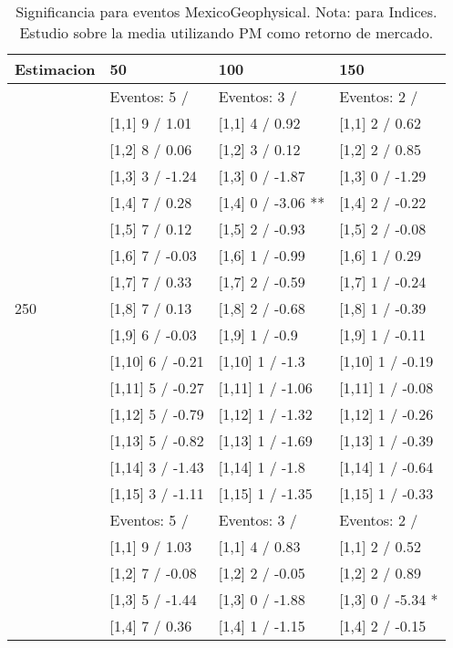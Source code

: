 \begin{table}

\caption{Significancia para eventos MexicoGeophysical. Nota: para Indices. Estudio sobre la media utilizando PM como retorno de mercado.}
\centering
\begin{tabular}[t]{llll}
\toprule
Estimacion & 50 & 100 & 150\\
\midrule
 & Eventos:  5 / & Eventos:  3 / & Eventos:  2 /\\
 & {}[1,1] 9  / 1.01 & {}[1,1] 4  / 0.92 & {}[1,1] 2  / 0.62\\
 & {}[1,2] 8  / 0.06 & {}[1,2] 3  / 0.12 & {}[1,2] 2  / 0.85\\
 & {}[1,3] 3  / -1.24 & {}[1,3] 0  / -1.87 & {}[1,3] 0  / -1.29\\
 & {}[1,4] 7  / 0.28 & {}[1,4] 0  / -3.06 ** & {}[1,4] 2  / -0.22\\
\addlinespace
 & {}[1,5] 7  / 0.12 & {}[1,5] 2  / -0.93 & {}[1,5] 2  / -0.08\\
 & {}[1,6] 7  / -0.03 & {}[1,6] 1  / -0.99 & {}[1,6] 1  / 0.29\\
 & {}[1,7] 7  / 0.33 & {}[1,7] 2  / -0.59 & {}[1,7] 1  / -0.24\\
250 & {}[1,8] 7  / 0.13 & {}[1,8] 2  / -0.68 & {}[1,8] 1  / -0.39\\
 & {}[1,9] 6  / -0.03 & {}[1,9] 1  / -0.9 & {}[1,9] 1  / -0.11\\
\addlinespace
 & {}[1,10] 6  / -0.21 & {}[1,10] 1  / -1.3 & {}[1,10] 1  / -0.19\\
 & {}[1,11] 5  / -0.27 & {}[1,11] 1  / -1.06 & {}[1,11] 1  / -0.08\\
 & {}[1,12] 5  / -0.79 & {}[1,12] 1  / -1.32 & {}[1,12] 1  / -0.26\\
 & {}[1,13] 5  / -0.82 & {}[1,13] 1  / -1.69 & {}[1,13] 1  / -0.39\\
 & {}[1,14] 3  / -1.43 & {}[1,14] 1  / -1.8 & {}[1,14] 1  / -0.64\\
\addlinespace
 & {}[1,15] 3  / -1.11 & {}[1,15] 1  / -1.35 & {}[1,15] 1  / -0.33\\
 & Eventos:  5 / & Eventos:  3 / & Eventos:  2 /\\
 & {}[1,1] 9  / 1.03 & {}[1,1] 4  / 0.83 & {}[1,1] 2  / 0.52\\
 & {}[1,2] 7  / -0.08 & {}[1,2] 2  / -0.05 & {}[1,2] 2  / 0.89\\
 & {}[1,3] 5  / -1.44 & {}[1,3] 0  / -1.88 & {}[1,3] 0  / -5.34 *\\
\addlinespace
 & {}[1,4] 7  / 0.36 & {}[1,4] 1  / -1.15 & {}[1,4] 2  / -0.15\\

\end{tabular}
\end{table}
